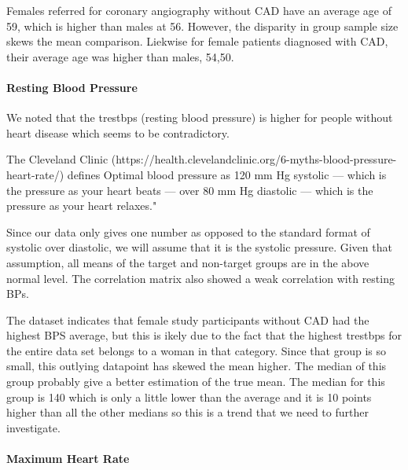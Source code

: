 \documentclass[11pt]{article}
\begin{document}
Females referred for coronary angiography without CAD have an average
age of 59, which is higher than males at 56. However, the disparity in
group sample size skews the mean comparison. Liekwise for female
patients diagnosed with CAD, their average age was higher than males,
54,50.

    \paragraph{Resting Blood Pressure}\label{resting-blood-pressure}

We noted that the trestbps (resting blood pressure) is higher for people
without heart disease which seems to be contradictory.

The Cleveland Clinic
(https://health.clevelandclinic.org/6-myths-blood-pressure-heart-rate/)
defines Optimal blood pressure as 120 mm Hg systolic --- which is the
pressure as your heart beats --- over 80 mm Hg diastolic --- which is
the pressure as your heart relaxes."

Since our data only gives one number as opposed to the standard format
of systolic over diastolic, we will assume that it is the systolic
pressure. Given that assumption, all means of the target and non-target
groups are in the above normal level. The correlation matrix also showed
a weak correlation with resting BPs.

The dataset indicates that female study participants without CAD had the
highest BPS average, but this is ikely due to the fact that the highest
trestbps for the entire data set belongs to a woman in that category.
Since that group is so small, this outlying datapoint has skewed the
mean higher. The median of this group probably give a better estimation
of the true mean. The median for this group is 140 which is only a
little lower than the average and it is 10 points higher than all the
other medians so this is a trend that we need to further investigate.

    \paragraph{Maximum Heart Rate}\label{maximum-heart-rate}
\end{document}
